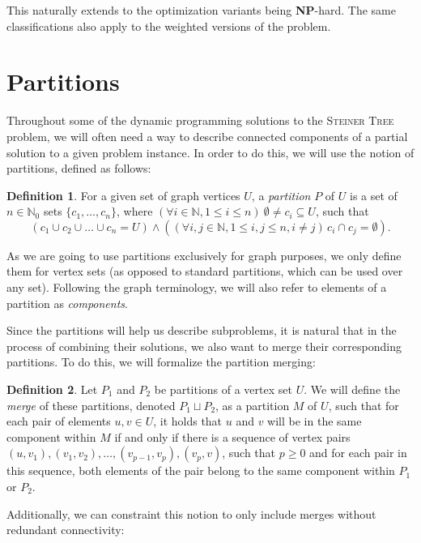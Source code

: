 \documentclass[thesis=M,english,hidelinks]{FITthesis}[2012/10/20]
\theoremstyle{definition}
\newtheorem{definition}{Definition}
\newcommand{\NPH}{\textbf{NP}-hard\xspace}
\begin{document}
This naturally extends to the optimization variants being \NPH. The same classifications also apply to the weighted
versions of the problem.

\section{Partitions}

Throughout some of the dynamic programming solutions to the \textsc{Steiner Tree} problem, we will often need a way to
describe connected components of a partial solution to a given problem instance. In order to do this, we will use the
notion of partitions, defined as follows:

\begin{definition}
    For a given set of graph vertices $U$, a \emph{partition} $P$ of $U$ is a set of $n \in \mathbb{N}_0$ sets $\{c_1, \ldots,
    c_n\}$, where $(\forall i \in \mathbb{N}, 1 \leq i \leq n)\ \emptyset \neq c_i \subseteq U$, such that
    $$
    (c_1 \cup c_2 \cup \ldots \cup c_n = U) \land ((\forall i, j \in \mathbb{N}, 1 \leq i, j \leq n, i \neq j)\,c_i \cap c_j = \emptyset).
    $$
\end{definition}

As we are going to use partitions exclusively for graph purposes, we only define them for vertex sets (as opposed to
standard partitions, which can be used over any set). Following the graph terminology, we will also refer to elements of
a partition as \emph{components}.

Since the partitions will help us describe subproblems, it is natural that in the process of combining their solutions,
we also want to merge their corresponding partitions. To do this, we will formalize the partition merging:

\begin{definition}
    Let $P_1$ and $P_2$ be partitions of a vertex set $U$. We will define the \emph{merge} of these partitions, denoted
    $P_1 \sqcup P_2$, as a partition $M$ of $U$, such that for each pair of elements $u, v \in U$, it holds that $u$
    and $v$ will be in the same component within $M$ if and only if there is a sequence of vertex pairs $(u, v_1), (v_1,
    v_2), \ldots, (v_{p-1}, v_p), (v_p, v)$, such that $p \geq 0$ and for each pair in this sequence, both elements of
    the pair belong to the same component within $P_1$ or $P_2$.
\end{definition}

Additionally, we can constraint this notion to only include merges without redundant connectivity:
\end{document}
